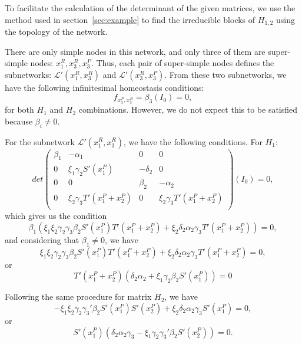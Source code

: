 To facilitate the calculation of the determinant of the given 
matrices, we use the method used in section~\ref{sec:example}
to find the irreducible blocks of $H_{1,2}$ using the topology 
of the network.

There are only simple nodes in this network, and only three of 
them are super-simple nodes: $x_1^R, x_3^R, x_3^P$. Thus, each 
pair of super-simple nodes defines the subnetworks: 
$\mathcal{L}'(x_1^R, x_3^R)$ and $\mathcal{L}'(x_3^R, x_3^P)$. 
From these two subnetworks, we have 
the following infinitesimal homeostasis conditions:
\begin{equation}
    f_{x_3^P,x_3^R} = \beta_3(I_0) = 0,
\end{equation}
for both $H_1$ and $H_2$ combinations. However, we do not expect 
this to be satisfied because $\beta_i \neq 0$.

For the subnetwork $\mathcal{L}'(x_1^R, x_3^R)$, we have the 
following conditions. For $H_1$:
\begin{equation}
    det 
    \begin{pmatrix}
        \beta_1 & -\alpha_1 & 0 & 0  \\
        0 & \xi_1\gamma_2 S'(x_1^P) & -\delta_2 & 0 \\
        0 & 0 & \beta_2 & -\alpha_2 \\
        0 & \xi_2 \gamma_3 T'(x_1^P + x_2^P) & 0 & \xi_2 \gamma_3 T'(x_1^P + x_2^P) \\
    \end{pmatrix}(I_0) = 0,
\end{equation}
which gives us the condition
\begin{equation}
    \beta_1(\xi_1 \xi_2 \gamma_2 \gamma_3 \beta_2 S'(x_1^P)
    T'(x_1^P + x_2^P) + \xi_2 \delta_2 \alpha_2 \gamma_3 
    T'(x_1^P + x_2^P)) = 0,
\end{equation}
and considering that $\beta_1 \neq 0$, we have 
\begin{equation}
    \xi_1 \xi_2 \gamma_2 \gamma_3 \beta_2 S'(x_1^P)
    T'(x_1^P + x_2^P) + \xi_2 \delta_2 \alpha_2 \gamma_3 
    T'(x_1^P + x_2^P) = 0,
\end{equation}
or
\begin{equation}
    T'(x_1^P + x_2^P)(\delta_2 \alpha_2 + 
    \xi_1 \gamma_2 \beta_2 S'(x_1^P)) = 0
\end{equation}

Following the same procedure for matrix $H_2$, we have 
\begin{equation}
    -\xi_1 \xi_2 \gamma_2 \gamma_3' \beta_2 S'(x_1^P)
    S'(x_2^P) + \xi_2 \delta_2 \alpha_2 \gamma_3 
    S'(x_1^P) = 0,
\end{equation}
or 
\begin{equation}
    S'(x_1^P)(\delta_2 \alpha_2 \gamma_3 - \xi_1 \gamma_2 
    \gamma_3' \beta_2 S'(x_2^P)) = 0.
\end{equation}


